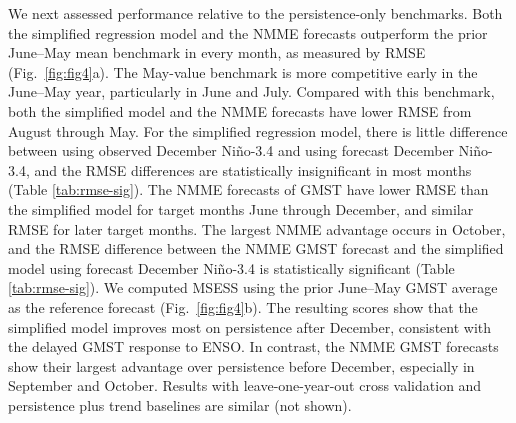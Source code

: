 \documentclass[draft]{agujournal2019}
\begin{document}
We next assessed performance relative to the persistence-only benchmarks. Both the simplified regression model and the NMME forecasts outperform the prior June--May mean benchmark in every month, as measured by RMSE (Fig.\ \ref{fig:fig4}a). The May-value benchmark is more competitive early in the June--May year, particularly in June and July. Compared with this benchmark, both the simplified model and the NMME forecasts have lower RMSE from August through May. For the simplified regression model, there is little difference between using observed December Ni\~no-3.4 and using forecast December Ni\~no-3.4, and the RMSE differences are statistically insignificant in most months (Table \ref{tab:rmse-sig}). The NMME forecasts of GMST have lower RMSE than the simplified model for target months June through December, and similar RMSE for later target months. The largest NMME advantage occurs in October, and the RMSE difference between the NMME GMST forecast and the simplified model using forecast December Ni\~no-3.4 is statistically significant (Table \ref{tab:rmse-sig}). We computed MSESS using the prior June--May GMST average as the reference forecast (Fig.\ \ref{fig:fig4}b). The resulting scores show that the simplified model improves most on persistence after December, consistent with the delayed GMST response to ENSO. In contrast, the NMME GMST forecasts show their largest advantage over persistence before December, especially in September and October. Results with leave-one-year-out cross validation and persistence plus trend baselines are similar (not shown).
\end{document}
